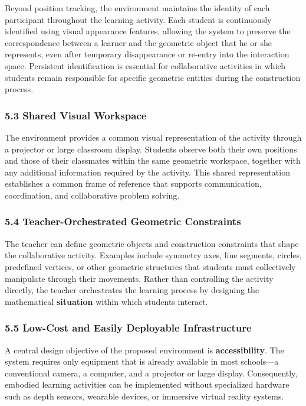Beyond position tracking, the environment maintains the identity of each
participant throughout the learning activity. Each student is
continuously identified using visual appearance features, allowing the
system to preserve the correspondence between a learner and the
geometric object that he or she represents, even after temporary
disappearance or re-entry into the interaction space. Persistent
identification is essential for collaborative activities in which
students remain responsible for specific geometric entities during the
construction process.

\subsubsection{5.3 Shared Visual
Workspace}\label{shared-visual-workspace}

The environment provides a common visual representation of the activity
through a projector or large classroom display. Students observe both
their own positions and those of their classmates within the same
geometric workspace, together with any additional information required
by the activity. This shared representation establishes a common frame
of reference that supports communication, coordination, and
collaborative problem solving.

\subsubsection{5.4 Teacher-Orchestrated Geometric
Constraints}\label{teacher-orchestrated-geometric-constraints}

The teacher can define geometric objects and construction constraints
that shape the collaborative activity. Examples include symmetry axes,
line segments, circles, predefined vertices, or other geometric
structures that students must collectively manipulate through their
movements. Rather than controlling the activity directly, the teacher
orchestrates the learning process by designing the mathematical
\textbf{situation} within which students interact.

\subsubsection{5.5 Low-Cost and Easily Deployable
Infrastructure}\label{low-cost-and-easily-deployable-infrastructure}

A central design objective of the proposed environment is
\textbf{accessibility}. The system requires only equipment that is
already available in most schools---a conventional camera, a computer,
and a projector or large display. Consequently, embodied learning
activities can be implemented without specialized hardware such as depth
sensors, wearable devices, or immersive virtual reality systems.

